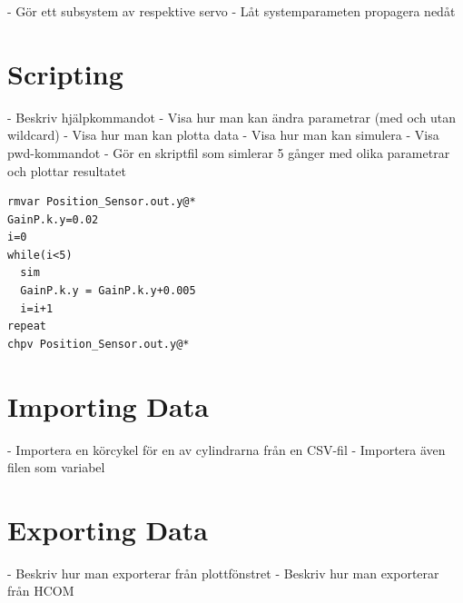\documentclass[a4paper,pdftex]{article}
\begin{document}
- Gör ett subsystem av respektive servo
- Låt systemparameten propagera nedåt

\section{Scripting}
- Beskriv hjälpkommandot
- Visa hur man kan ändra parametrar (med och utan wildcard)
- Visa hur man kan plotta data
- Visa hur man kan simulera
- Visa pwd-kommandot
- Gör en skriptfil som simlerar 5 gånger med olika parametrar och plottar resultatet

\begin{lstlisting}[basicstyle=\ttfamily]
rmvar Position_Sensor.out.y@*
GainP.k.y=0.02
i=0
while(i<5)
  sim
  GainP.k.y = GainP.k.y+0.005
  i=i+1
repeat
chpv Position_Sensor.out.y@*
\end{lstlisting}

\section{Importing Data}
- Importera en körcykel för en av cylindrarna från en CSV-fil
- Importera även filen som variabel

\section{Exporting Data}
- Beskriv hur man exporterar från plottfönstret
- Beskriv hur man exporterar från HCOM
\end{document}
